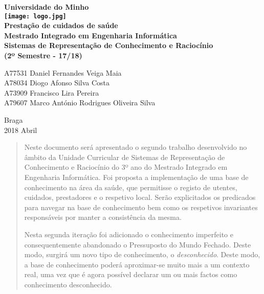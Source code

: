 \documentclass[a4paper]{article}
\begin{document}
\vfill
\begin{center}
    \Huge\bfseries
    Universidade do Minho \\
    \vspace{10mm}
    \texttt{[image: logo.jpg]}\\[0.5cm]
    \vspace{30mm}
    \LARGE\bfseries
   		Prestação de cuidados de saúde \\
    \vspace{30mm}
    \large\bfseries
    Mestrado Integrado em Engenharia Informática \\
    \vspace{20mm}
    Sistemas de Representação de Conhecimento e Raciocínio \\
    (2º Semestre - 17/18)
\end{center}

\vfill

\begin{flushleft}
A77531 \hspace{3mm} Daniel Fernandes Veiga Maia \\
A78034 \hspace{3mm} Diogo Afonso Silva Costa \\
A73909 \hspace{3mm} Francisco Lira Pereira \\
A79607 \hspace{3mm} Marco António Rodrigues Oliveira Silva \\
\end{flushleft}

\vspace{10mm}

\begin{flushright}
Braga \\
2018 Abril
\end{flushright}

\thispagestyle{empty}

\newpage

\begin{abstract}

\hspace{3mm} Neste documento será apresentado o segundo trabalho desenvolvido no âmbito da Unidade Curricular de Sistemas de Representação de Conhecimento e Raciocínio do 3º ano do Mestrado Integrado em Engenharia Informática. Foi proposta a implementação de uma base de conhecimento na área da saúde, que permitisse o registo de utentes, cuidados, prestadores e o respetivo local. Serão explicitados os predicados para navegar na base de conhecimento bem como os respetivos invariantes responsáveis por manter a consistência da mesma. 

Nesta segunda iteração foi adicionado o conhecimento imperfeito e consequentemente abandonado o Pressuposto do Mundo Fechado. Deste modo, surgirá um novo tipo de conhecimento, o \emph{desconhecido}. Deste modo, a base de conhecimento poderá aproximar-se muito mais a um contexto real, uma vez que é agora possível declarar um ou mais factos como conhecimento desconhecido.


\end{abstract}
\end{document}
